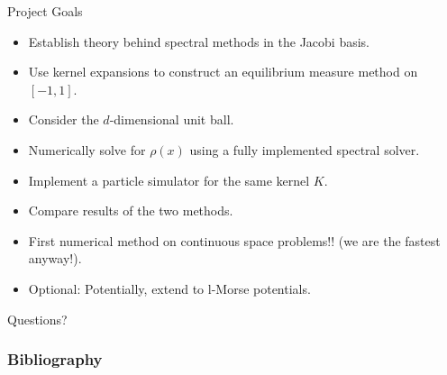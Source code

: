 \documentclass[aspectratio=169, hyperref={colorlinks=true}]{beamer}
\begin{document}
  \begin{frame}{Project Goals}
    \begin{itemize}
      \item Establish theory behind spectral methods in the Jacobi basis.
      \item Use kernel expansions to construct an equilibrium measure method on $[-1, 1]$.
      \item Consider the $d$-dimensional unit ball.
      \item Numerically solve for $\rho(x)$ using a fully implemented spectral solver.
      \item Implement a particle simulator for the same kernel $K$.
      \item Compare results of the two methods.
      \item First numerical method on continuous space problems!! (we are the fastest anyway!).
      \item Optional: Potentially, extend to l-Morse potentials.
    \end{itemize}
  \end{frame}

  \begin{frame}{}
    Questions?
  \end{frame}

  \begin{frame}[allowframebreaks]
    \frametitle{Bibliography}
    \printbibliography[heading=bibnumbered]
  \end{frame}
\end{document}
